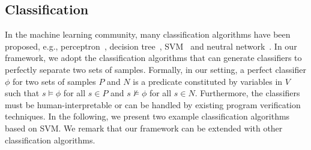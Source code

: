 \subsection{Classification}
In the machine learning community, many classification algorithms have been proposed, e.g., perceptron~\cite{???}, decision tree~\cite{quinlan1986induction}, SVM~\cite{???} and neutral network~\cite{???}.
In our framework, we adopt the classification algorithms that can generate classifiers to perfectly separate two sets of samples. Formally, in our setting, a perfect classifier $\phi$ for two sets of samples $P$ and $N$ is a predicate constituted by variables in $V$ such that $s \models \phi$ for all $s \in P$ and $s \not \models \phi$ for all $s \in N$. Furthermore, the classifiers must be human-interpretable or can be handled by existing program verification techniques. In the following, we present two example classification algorithms based on SVM.
We remark that our framework can be extended with other classification algorithms.

